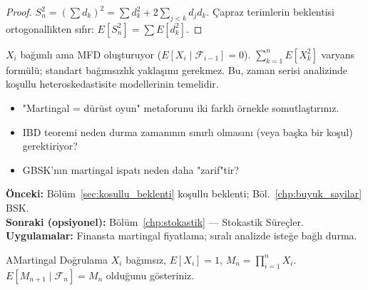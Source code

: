 \begin{proof}
$S_n^2 = (\sum d_k)^2 = \sum d_k^2 + 2\sum_{j<k} d_j d_k$.
Çapraz terimlerin beklentisi ortogonallikten sıfır: $E[S_n^2] = \sum E[d_k^2]$.
\end{proof}

\begin{ornek}
$X_i$ bağımlı ama MFD oluşturuyor ($E[X_i\mid\mathcal{F}_{i-1}]=0$).
$\sum_{k=1}^n E[X_k^2]$ varyans formülü; standart bağımsızlık yaklaşımı gerekmez.
Bu, zaman serisi analizinde koşullu heteroskedastisite modellerinin temelidir.
\end{ornek}

\begin{ozyansima}
\begin{itemize}
  \item "Martingal = dürüst oyun" metaforunu iki farklı örnekle somutlaştırınız.
  \item IBD teoremi neden durma zamanının sınırlı olmasını (veya başka bir koşul) gerektiriyor?
  \item GBSK'nın martingal ispatı neden daha "zarif"tir?
\end{itemize}
\end{ozyansima}

\begin{kopru}
\textbf{Önceki:} Bölüm~\ref{sec:kosullu_beklenti} koşullu beklenti; Böl.~\ref{chp:buyuk_sayilar} BSK.\\
\textbf{Sonraki (opsiyonel):} Bölüm~\ref{chp:stokastik} --- Stokastik Süreçler.\\
\textbf{Uygulamalar:} Finansta martingal fiyatlama; sıralı analizde isteğe bağlı durma.
\end{kopru}


\cozumlualistirmalar

\begin{alistirma}[Al.9.1]{A}{Martingal Doğrulama}
$X_i$ bağımsız, $E[X_i]=1$, $M_n = \prod_{i=1}^n X_i$.
$E[M_{n+1}\mid\mathcal{F}_n] = M_n$ olduğunu gösteriniz.
\end{alistirma}

